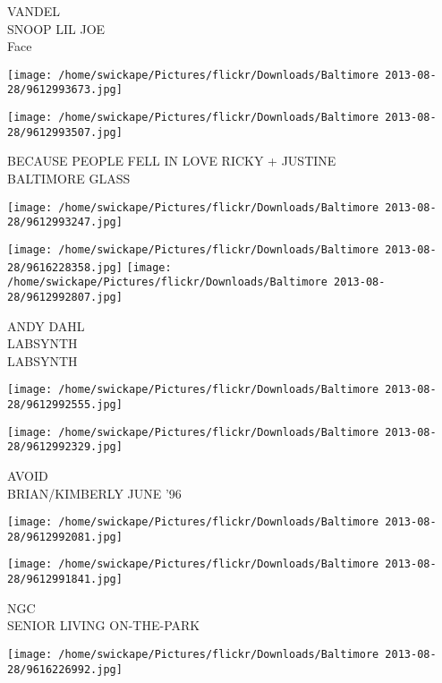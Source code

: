 \documentclass[10pt,letterpaper]{article}
\begin{document}
VANDEL\\
SNOOP LIL JOE\\
Face\\
\pagebreak

\texttt{[image: /home/swickape/Pictures/flickr/Downloads/Baltimore 2013-08-28/9612993673.jpg]}

\vspace{0.25in}
\texttt{[image: /home/swickape/Pictures/flickr/Downloads/Baltimore 2013-08-28/9612993507.jpg]}

BECAUSE PEOPLE FELL IN LOVE RICKY + JUSTINE\\
BALTIMORE GLASS\\
\pagebreak

\texttt{[image: /home/swickape/Pictures/flickr/Downloads/Baltimore 2013-08-28/9612993247.jpg]}

\vspace{0.25in}
\texttt{[image: /home/swickape/Pictures/flickr/Downloads/Baltimore 2013-08-28/9616228358.jpg]}
\texttt{[image: /home/swickape/Pictures/flickr/Downloads/Baltimore 2013-08-28/9612992807.jpg]}

ANDY DAHL\\
LABSYNTH\\
LABSYNTH\\
\pagebreak

\texttt{[image: /home/swickape/Pictures/flickr/Downloads/Baltimore 2013-08-28/9612992555.jpg]}

\vspace{0.25in}
\texttt{[image: /home/swickape/Pictures/flickr/Downloads/Baltimore 2013-08-28/9612992329.jpg]}

AVOID\\
BRIAN/KIMBERLY JUNE '96\\
\pagebreak

\texttt{[image: /home/swickape/Pictures/flickr/Downloads/Baltimore 2013-08-28/9612992081.jpg]}

\vspace{0.25in}
\texttt{[image: /home/swickape/Pictures/flickr/Downloads/Baltimore 2013-08-28/9612991841.jpg]}

NGC\\
SENIOR LIVING ON{-}THE{-}PARK\\
\pagebreak

\texttt{[image: /home/swickape/Pictures/flickr/Downloads/Baltimore 2013-08-28/9616226992.jpg]}
\end{document}
